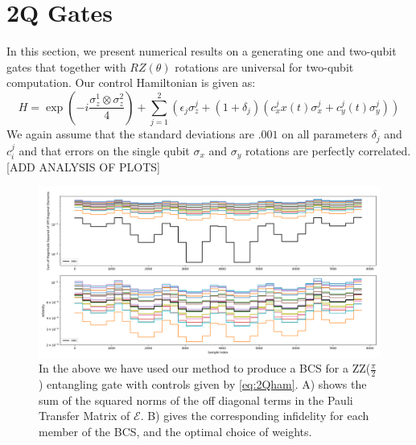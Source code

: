 \documentclass[aps,nofootinbib,pra,notitlepage,twocolumn]{revtex4-1}
\begin{document}
\section{2Q Gates}\label{2Q Gates}
 In this section, we present numerical results on a generating one and two-qubit gates that together with $RZ(\theta)$ rotations are universal for two-qubit computation. Our control Hamiltonian is given as: 
\begin{equation} \label{eq:2Qham}
H = \exp{(-i\frac{\sigma_z^1\otimes\sigma_z^2}{4})} + \sum_{j=1}^2(\epsilon_j\sigma_z^j + (1 + \delta_j)(c_x^jx(t)\sigma_x^j + c_y^j(t)\sigma_y^j))
\end{equation}
We again assume that the standard deviations are $.001$ on all parameters $\delta_j$ and $c^j_i$ and that errors on the single qubit $\sigma_x$ and $\sigma_y$ rotations are perfectly correlated.
[ADD ANALYSIS OF PLOTS]
\begin{figure}[t]
\centering
\includegraphics[width=\textwidth]{2Q.png}
\caption{In the above we have used our method to produce a BCS for a ZZ($\frac{\pi}{2}$) entangling gate with controls given by \ref{eq:2Qham}. A) shows the sum of the squared norms of the off diagonal terms in the Pauli Transfer Matrix of $\mathcal{E}$. B) gives the corresponding infidelity for each member of the BCS, and the optimal choice of weights.}
\end{figure}












\end{document}
